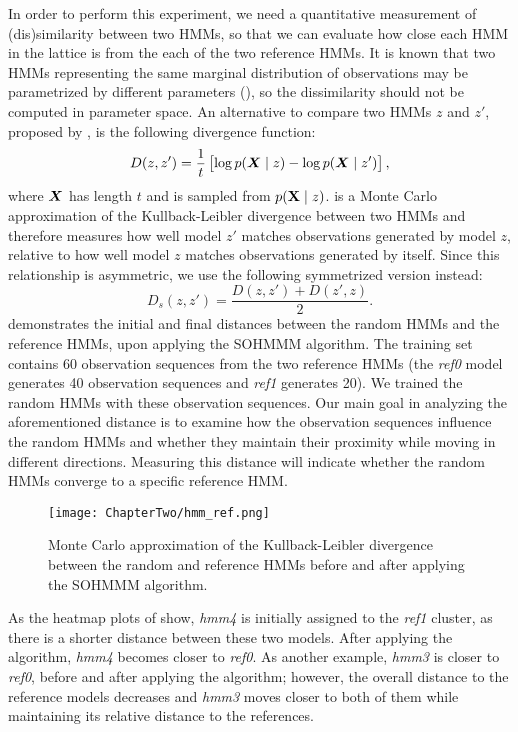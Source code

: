 In order to perform this experiment, we need a quantitative measurement of (dis)similarity between two HMMs, so that we can evaluate how close each HMM in the lattice is from the each of the two reference HMMs. It is known that two HMMs representing the same marginal distribution of observations may be parametrized by different parameters (\citet{Rabiner1989}), so the dissimilarity should not be computed in parameter space. An alternative to compare two HMMs $z$ and $z'$, proposed by \citet{Juang1985}, is the following divergence function:
\begin{equation}
D(z, z') = \frac{1}{t}\left[\log p({\bm{X}} \mid z) - \log p({\bm{X}} \mid z')\right],
\label{eq:hmm_div}
\end{equation}
where ${\bm{X}}$ has length $t$ and is sampled from $p({\mathbf{X}} \mid z)$.  is a Monte Carlo approximation of the Kullback-Leibler divergence between two HMMs and therefore measures how well model $z'$ matches observations generated by model $z$, relative to how well model $z$ matches observations generated by itself. Since this relationship is asymmetric, we use the following symmetrized version instead:
\begin{equation}
D_{s}(z,z') = \frac{D(z,z')+D(z',z)}{2}.
\label{eq:hmm_div_sym}
\end{equation}
 demonstrates the initial and final distances between the random HMMs and the reference HMMs, upon applying the SOHMMM algorithm. The training set contains 60 observation sequences from the two reference HMMs (the \textit{ref0} model generates 40 observation sequences and \textit{ref1} generates 20). We trained the random HMMs with these observation sequences. 
Our main goal in analyzing the aforementioned distance is to examine how the observation sequences influence the random HMMs and whether they maintain their proximity while moving in different directions. Measuring this distance will indicate whether the random HMMs converge to a specific reference HMM.

\begin{figure}[h]
	\centering
	\texttt{[image: ChapterTwo/hmm\_ref.png]}
	\caption{Monte Carlo approximation of the Kullback-Leibler divergence between the random and reference HMMs before and after applying the SOHMMM algorithm.}
	\label{fig:sohmmm_distances}      
\end{figure}

As the heatmap plots of  show, \textit{hmm4} is initially assigned to the \textit{ref1} cluster, as there is a shorter distance between these two models. After applying the algorithm, \textit{hmm4} becomes closer to \textit{ref0}. As another example, \textit{hmm3} is closer to \textit{ref0}, before and after applying the algorithm; however, the overall distance to the reference models decreases and \textit{hmm3} moves closer to both of them while maintaining its relative distance to the references. 

